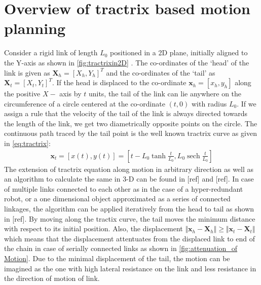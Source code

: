 \documentclass[12pt,a4]{article}
\DeclareMathOperator{\sech}{sech}
\begin{document}
\section{Overview of tractrix based motion planning}
\label{sec:Tractrixoverview}
%
Consider a rigid link of length $L_0$ positioned in a 2D plane, initially aligned to the Y-axis as shown in \cref{fig:tractrixin2D} . The co-ordinates of the `head' of the link is given as $\textbf{X}_h = [X_h,Y_h]^T$ and the co-ordinates of the `tail' as $\textbf{X}_t = [X_t,Y_t]^T$. If the head is displaced to the co-ordinate $\textbf{x}_h = [x_h,y_h]$ along the positive $X-$ axis by $t$ units, the tail of the link can lie anywhere on the circumference of a circle centered at the co-ordinate $(t,0)$ with radius $L_0$. If we assign a rule that the velocity of the tail of the link is always directed towards the length of the link, we get two diametrically opposite points on the circle. The continuous path traced by the tail point is the well known tractrix curve as given in \cref{eq:tractrix}:
\begin{align}
\label{eq:tractrix}
\textbf{x}_t = [x(t),y(t)] = [t-L_0\tanh\frac{t}{L_0},L_0\sech\frac{t}{L_0}]
\end{align}
The extension of tractrix equation along motion in arbitrary direction as well as an algorithm to calculate the same in 3-D can be found in [ref] and [ref]. In case of multiple links connected to each other as in the case of a hyper-redundant robot, or a one dimensional object approximated as a series of connected linkages, the algorithm can be applied iteratively from the head to tail as shown in [ref]. By moving along the tractix curve, the tail moves the minimum distance with respect to its initial position. Also, the displacement $\Vert \textbf{x}_h-\textbf{X}_h \Vert \geq \Vert \textbf{x}_t-\textbf{X}_t \Vert$ which means that the displacement attentuates from the displaced link to end of the chain in case of serially connected links as shown in \cref{fig:attenuation_of Motion}. Due to the minimal displacement of the tail, the motion can be imagined as the one with high lateral resistance on the link and less resistance in the direction of motion of link. 
\end{document}
